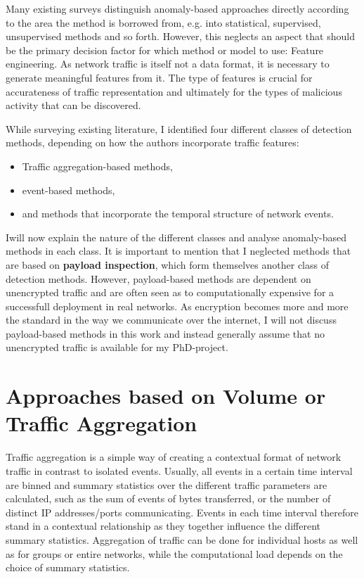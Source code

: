 \documentclass[a4paper,12pt,twoside]{report}
\begin{document}
Many existing surveys \cite{ahmed2016survey,buczak_survey_2016,bhuyan_network_2014} distinguish anomaly-based approaches directly according to the area the method is borrowed from, e.g. into statistical, supervised, unsupervised methods and so forth. 
However, this neglects an aspect that should be the primary decision factor for which method or model to use: Feature engineering. As network traffic is itself not a data format, it is necessary to generate meaningful features from it. The type of features is crucial for accurateness of traffic representation and ultimately for the types of malicious activity that can be discovered. 


While surveying existing literature, I identified four different classes of detection methods, depending on how the authors incorporate traffic features: 

\begin{itemize}
\item Traffic aggregation-based methods,
\item event-based methods,
\item and methods that incorporate the temporal structure of network events.
\end{itemize}

Iwill now explain the nature of the different classes and analyse anomaly-based methods in each class. It is important to mention that I neglected methods that are based on \textbf{payload inspection}, which form themselves another class of detection methods. However, payload-based methods are dependent on unencrypted traffic and are often seen as to computationally expensive for a successfull deployment in real networks. As encryption becomes more and more the standard in the way we communicate over the internet, I will not discuss payload-based methods in this work and instead generally assume that no unencrypted traffic is available for my PhD-project.

\section{Approaches based on Volume or Traffic Aggregation}

Traffic aggregation is a simple way of creating a contextual format of network traffic in contrast to isolated events. Usually, all events in a certain time interval are binned and summary statistics over the different traffic parameters are calculated, such as the sum of events of bytes transferred, or the number of distinct IP addresses/ports communicating. Events in each time interval therefore stand in a contextual relationship as they together influence the different summary statistics.  Aggregation of traffic can be done for individual hosts as well as for groups or entire networks, while the computational load depends on the choice of summary statistics. 
\end{document}
